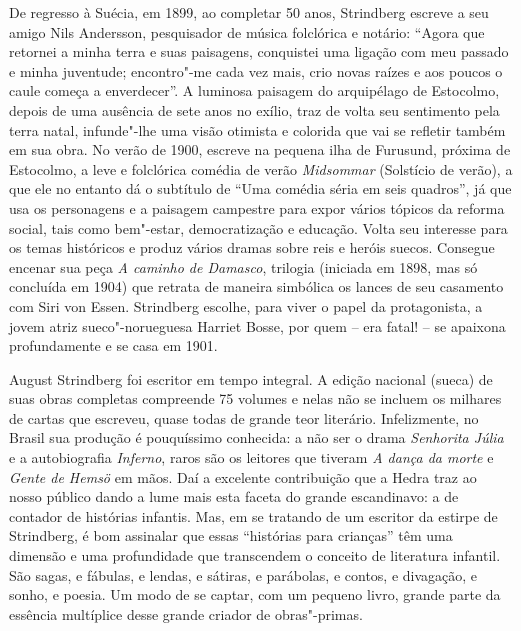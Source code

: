 De regresso à Suécia, em 1899, ao completar 50 anos, Strindberg escreve
a seu amigo Nils Andersson, pesquisador de música folclórica e notário:
``Agora que retornei a minha terra e suas paisagens, conquistei uma
ligação com meu passado e minha juventude; encontro"-me cada vez mais,
crio novas raízes e aos poucos o caule começa a enverdecer''. A luminosa
paisagem do arquipélago de Estocolmo, depois de uma ausência de sete
anos no exílio, traz de volta seu sentimento pela terra natal,
infunde"-lhe uma visão otimista e colorida que vai se refletir também
em sua obra. No verão de 1900, escreve na pequena ilha de Furusund,
próxima de Estocolmo, a leve e folclórica comédia de verão
\textit{Midsommar} (Solstício de verão), a que ele no entanto dá o
subtítulo de ``Uma comédia séria em seis quadros'', já que usa os
personagens e a paisagem campestre para expor vários tópicos da reforma
social, tais como bem"-estar, democratização e educação. Volta seu
interesse para os temas históricos e produz vários dramas sobre reis e
heróis suecos. Consegue encenar sua peça \textit{A caminho de Damasco},
trilogia (iniciada em 1898, mas só concluída em 1904) que retrata de
maneira simbólica os lances de seu casamento com Siri von Essen.
Strindberg escolhe, para viver o papel da protagonista, a jovem atriz
sueco"-norueguesa Harriet Bosse, por quem -- era fatal! -- se apaixona
profundamente e se casa em 1901.

August Strindberg foi escritor em tempo integral. A edição nacional
(sueca) de suas obras completas compreende 75 volumes e nelas não se
incluem os milhares de cartas que escreveu, quase todas de grande teor
literário. Infelizmente, no Brasil sua produção é pouquíssimo
conhecida: a não ser o drama \textit{Senhorita Júlia} e a autobiografia
\textit{Inferno}, raros são os leitores que tiveram \textit{A dança da
morte} e \textit{Gente de Hemsö} em mãos. Daí a excelente
contribuição que a Hedra traz ao nosso público dando a lume mais esta
faceta do grande escandinavo: a de contador de histórias infantis. Mas,
em se tratando de um escritor da estirpe de Strindberg, é bom assinalar
que essas ``histórias para crianças'' têm uma dimensão e uma profundidade
que transcendem o conceito de literatura infantil. São sagas, e
fábulas, e lendas, e sátiras, e parábolas, e contos, e divagação, e
sonho, e poesia. Um modo de se captar, com um pequeno livro, grande
parte da essência multíplice desse grande criador de obras"-primas.
